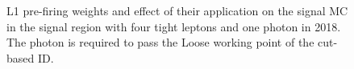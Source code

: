 \begin{figure}
\caption{L1 pre-firing weights and effect of their application on the signal MC in the signal region with four tight leptons and one photon in 2018.
The photon is required to pass the Loose working point of the cut-based ID.}
\label{fig:L1Prefiring}
\end{figure}
